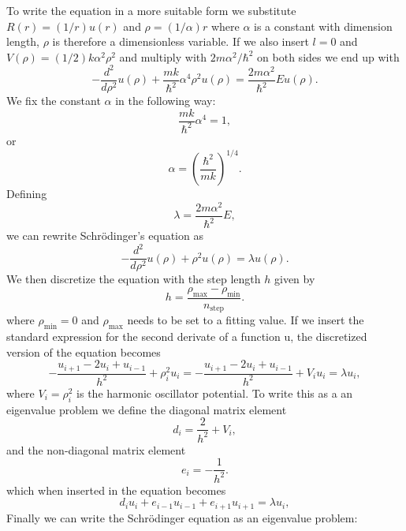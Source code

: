 \documentclass[a4paper,12pt, english]{article}
\begin{document}
To write the equation in a more suitable form we substitute 
$R(r) = (1/r) u(r)$ and $\rho = (1/\alpha) r$ where $\alpha$ is a constant with dimension length,
$\rho$ is therefore a dimensionless variable. 
If we also insert $l=0$ and $V(\rho) = (1/2) k \alpha^2\rho^2$ and multiply with 
$2m\alpha^2/\hbar^2$ on both sides we end up with
\[
  -\frac{d^2}{d\rho^2} u(\rho) 
       + \frac{mk}{\hbar^2} \alpha^4\rho^2u(\rho)  = \frac{2m\alpha^2}{\hbar^2}E u(\rho) .
\]
We fix the constant $\alpha$ in the following way:
\[
\frac{mk}{\hbar^2} \alpha^4 = 1,
\]
or 
\[
\alpha = \left(\frac{\hbar^2}{mk}\right)^{1/4}.
\]
Defining 
\[
\lambda = \frac{2m\alpha^2}{\hbar^2}E,
\]
we can rewrite Schr\"odinger's equation as
\[
  -\frac{d^2}{d\rho^2} u(\rho) + \rho^2u(\rho)  = \lambda u(\rho) .
\]
We then discretize the equation with the step length $h$ given by
\[
  h=\frac{\rho_{\mathrm{max}}-\rho_{\mathrm{min}} }{n_{\mathrm{step}}}.
\]
where $\rho_{\mathrm{min}}=0$ and $\rho_{\mathrm{max}}$ needs to be set to a fitting value.
If we insert the standard expression for the second derivate of a function u,
the discretized version of the equation becomes
\[
-\frac{u_{i+1} -2u_i +u_{i-1}}{h^2}+\rho_i^2u_i=-\frac{u_{i+1} -2u_i +u_{i-1} }{h^2}+V_iu_i  = \lambda u_i,
\]
where $V_i=\rho_i^2$ is the harmonic oscillator potential.
To write this as a an eigenvalue problem we define the diagonal matrix element
\[
   d_i=\frac{2}{h^2}+V_i,
\]
and the non-diagonal matrix element 
\[
   e_i=-\frac{1}{h^2}.
\]
which when inserted in the equation becomes
\[
d_iu_i+e_{i-1}u_{i-1}+e_{i+1}u_{i+1}  = \lambda u_i,
\]
Finally we can write the Schr\"odinger equation as an eigenvalue problem:
\end{document}
